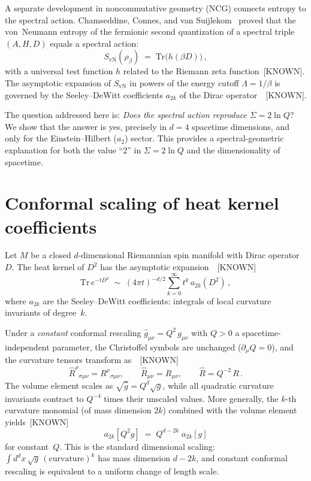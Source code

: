 \documentclass[prl,twocolumn,superscriptaddress,longbibliography]{revtex4-2}
\newcommand{\Tr}{\mathrm{Tr}}
\newcommand{\SvN}{S_{\mathrm{vN}}}
\begin{document}
A separate development in noncommutative geometry (NCG)
connects entropy to the spectral action.
Chamseddine, Connes, and van
Suijlekom~\cite{CCSvS2018} proved that the von~Neumann
entropy of the fermionic second quantization of
a spectral triple $(A,H,D)$ equals a spectral action:
\begin{equation}\label{eq:CCSvS}
  \SvN(\rho_\beta) \;=\; \Tr\bigl(h(\beta D)\bigr)\,,
\end{equation}
with a universal test function $h$ related to the
Riemann zeta function~[KNOWN].
The asymptotic expansion of $\SvN$ in powers of the
energy cutoff $\Lambda = 1/\beta$ is governed by the
Seeley--DeWitt coefficients $a_{2k}$ of the Dirac
operator~\cite{Vassilevich2003}~[KNOWN].

The question addressed here is:
\emph{Does the spectral action reproduce}
$\Sigma = 2\ln Q$?
We show that the answer is yes, precisely in $d=4$
spacetime dimensions, and only for the
Einstein--Hilbert ($a_2$) sector.
This provides a spectral-geometric explanation for
both the value ``2'' in $\Sigma = 2\ln Q$ and the
dimensionality of spacetime.


\section{Conformal scaling of heat kernel coefficients}
\label{sec:scaling}

Let $M$ be a closed $d$-dimensional Riemannian spin
manifold with Dirac operator $D$.
The heat kernel of $D^2$ has the asymptotic
expansion~\cite{Vassilevich2003,Gilkey1995}~[KNOWN]
\begin{equation}\label{eq:heat}
  \Tr\, e^{-t D^2}
  \;\sim\;
  (4\pi t)^{-d/2}
  \sum_{k=0}^{\infty} t^{k}\, a_{2k}(D^2)\,,
\end{equation}
where $a_{2k}$ are the Seeley--DeWitt coefficients:
integrals of local curvature invariants of degree~$k$.

Under a \emph{constant} conformal rescaling
$\hat{g}_{\mu\nu} = Q^2\, g_{\mu\nu}$ with
$Q > 0$ a spacetime-independent parameter, the
Christoffel symbols are unchanged ($\partial_\mu Q = 0$),
and the curvature tensors transform
as~\cite{Wald1984}~[KNOWN]
\begin{equation}
  \hat{R}^{\rho}{}_{\sigma\mu\nu}
  = R^{\rho}{}_{\sigma\mu\nu},\qquad
  \hat{R}_{\mu\nu} = R_{\mu\nu},\qquad
  \hat{R} = Q^{-2}\, R\,.
\end{equation}
The volume element scales as
$\sqrt{\hat{g}} = Q^d \sqrt{g}$, while all
quadratic curvature invariants contract to
$Q^{-4}$ times their unscaled values.
More generally, the $k$-th curvature monomial
(of mass dimension $2k$) combined with the volume
element yields~[KNOWN]
\begin{equation}\label{eq:a2k_scaling}
  \boxed{\;
  a_{2k}[Q^2 g]
  \;=\;
  Q^{d-2k}\; a_{2k}[g]
  \;}
\end{equation}
for constant~$Q$.
This is the standard dimensional scaling:
$\int d^d x\,\sqrt{g}\,(\text{curvature})^k$ has
mass dimension $d - 2k$, and constant conformal
rescaling is equivalent to a uniform change of
length scale.
\end{document}
